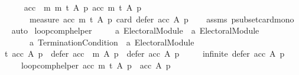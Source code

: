 \begin{isabellebody}
\ \ \isanewline
\ \ \ \ {\isachardoublequoteopen}{\isacharparenleft}{\kern0pt}{\isacharparenleft}{\kern0pt}acc\ {\isasymtriangleright}\ m{\isacharcomma}{\kern0pt}\ m{\isacharcomma}{\kern0pt}\ t{\isacharcomma}{\kern0pt}\ A{\isacharcomma}{\kern0pt}\ p{\isacharparenright}{\kern0pt}{\isacharcomma}{\kern0pt}\ {\isacharparenleft}{\kern0pt}acc{\isacharcomma}{\kern0pt}\ m{\isacharcomma}{\kern0pt}\ t{\isacharcomma}{\kern0pt}\ A{\isacharcomma}{\kern0pt}\ p{\isacharparenright}{\kern0pt}{\isacharparenright}{\kern0pt}\ {\isasymin}\isanewline
\ \ \ \ \ \ \ \ measure\ {\isacharparenleft}{\kern0pt}{\isasymlambda}{\isacharparenleft}{\kern0pt}acc{\isacharcomma}{\kern0pt}\ m{\isacharcomma}{\kern0pt}\ t{\isacharcomma}{\kern0pt}\ A{\isacharcomma}{\kern0pt}\ p{\isacharparenright}{\kern0pt}{\isachardot}{\kern0pt}\ card\ {\isacharparenleft}{\kern0pt}defer\ acc\ A\ p{\isacharparenright}{\kern0pt}{\isacharparenright}{\kern0pt}{\isachardoublequoteclose}\isanewline
%
\isadelimproof
\ \ %
\endisadelimproof
%
\isatagproof
{}\isamarkupfalse%
\ assms\ psubset{\isacharunderscore}{\kern0pt}card{\isacharunderscore}{\kern0pt}mono\isanewline
\ \ \isamarkupfalse%
\ auto%
\endisatagproof
{\isafoldproof}%
%
\isadelimproof
\isanewline
%
\endisadelimproof
\isanewline
\isanewline
{}\isamarkupfalse%
\ loop{\isacharunderscore}{\kern0pt}comp{\isacharunderscore}{\kern0pt}helper\ {\isacharcolon}{\kern0pt}{\isacharcolon}{\kern0pt}\isanewline
\ \ \ \ {\isachardoublequoteopen}{\isacharprime}{\kern0pt}a\ Electoral{\isacharunderscore}{\kern0pt}Module\ {\isasymRightarrow}\ {\isacharprime}{\kern0pt}a\ Electoral{\isacharunderscore}{\kern0pt}Module\ {\isasymRightarrow}\isanewline
\ \ \ \ \ \ \ \ {\isacharprime}{\kern0pt}a\ Termination{\isacharunderscore}{\kern0pt}Condition\ {\isasymRightarrow}\ {\isacharprime}{\kern0pt}a\ Electoral{\isacharunderscore}{\kern0pt}Module{\isachardoublequoteclose}\ \isanewline
\ \ {\isachardoublequoteopen}t\ {\isacharparenleft}{\kern0pt}acc\ A\ p{\isacharparenright}{\kern0pt}\ {\isasymor}\ {\isasymnot}{\isacharparenleft}{\kern0pt}{\isacharparenleft}{\kern0pt}defer\ {\isacharparenleft}{\kern0pt}acc\ {\isasymtriangleright}\ m{\isacharparenright}{\kern0pt}\ A\ p{\isacharparenright}{\kern0pt}\ {\isasymsubset}\ {\isacharparenleft}{\kern0pt}defer\ acc\ A\ p{\isacharparenright}{\kern0pt}{\isacharparenright}{\kern0pt}\ {\isasymor}\isanewline
\ \ \ \ infinite\ {\isacharparenleft}{\kern0pt}defer\ acc\ A\ p{\isacharparenright}{\kern0pt}\ {\isasymLongrightarrow}\isanewline
\ \ \ \ \ \ loop{\isacharunderscore}{\kern0pt}comp{\isacharunderscore}{\kern0pt}helper\ acc\ m\ t\ A\ p\ {\isacharequal}{\kern0pt}\ acc\ A\ p{\isachardoublequoteclose}\ {\isacharbar}{\kern0pt}\isanewline

\end{isabellebody}
